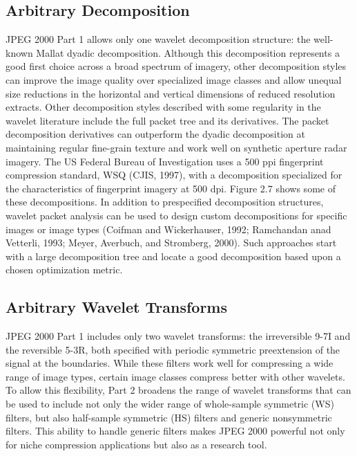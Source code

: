 \subsection{Arbitrary Decomposition}

JPEG 2000 Part 1 allows only one wavelet decomposition structure: the well-known
Mallat dyadic decomposition. Although this decomposition represents a good first choice
across a broad spectrum of imagery, other decomposition styles can improve the image
quality over specialized image classes and allow unequal size reductions in the horizontal
and vertical dimensions of reduced resolution extracts.
Other decomposition styles described with some regularity in the wavelet literature
include the full packet tree and its derivatives. The packet decomposition derivatives can
outperform the dyadic decomposition at maintaining regular fine-grain texture and work
well on synthetic aperture radar imagery. The US Federal Bureau of Investigation uses
a 500 ppi fingerprint compression standard, WSQ (CJIS, 1997), with a decomposition
specialized for the characteristics of fingerprint imagery at 500 dpi. Figure 2.7 shows
some of these decompositions.
In addition to prespecified decomposition structures, wavelet packet analysis can be
used to design custom decompositions for specific images or image types (Coifman and
Wickerhauser, 1992; Ramchandan anad Vetterli, 1993; Meyer, Averbuch, and Stromberg,
2000). Such approaches start with a large decomposition tree and locate a good decomposition
based upon a chosen optimization metric.

\subsection{Arbitrary Wavelet Transforms}

JPEG 2000 Part 1 includes only two wavelet transforms: the irreversible 9-7I and the
reversible 5-3R, both specified with periodic symmetric preextension of the signal at
the boundaries. While these filters work well for compressing a wide range of image
types, certain image classes compress better with other wavelets. To allow this flexibility,
Part 2 broadens the range of wavelet transforms that can be used to include not only the
wider range of whole-sample symmetric (WS) filters, but also half-sample symmetric (HS)
filters and generic nonsymmetric filters. This ability to handle generic filters makes JPEG
2000 powerful not only for niche compression applications but also as a research tool. \cite{jpeg_suite}


